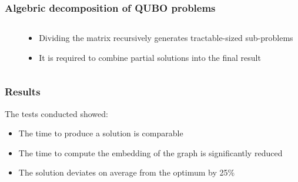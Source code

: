 \documentclass[aspectratio=169]{beamer}
\begin{document}
\begin{frame}\frametitle{Algebric decomposition of QUBO problems}

    \begin{columns}
        \begin{column}{0.5\textwidth}
            \begin{center}
            \end{center}
        \end{column}
        \begin{column}{0.5\textwidth}
            \begin{itemize}
                \item Dividing the matrix recursively generates tractable-sized sub-problems
                \item It is required to combine partial solutions into the final result
            \end{itemize}
        \end{column}
    \end{columns}

\end{frame}

\begin{frame}\frametitle{Results}

    The tests conducted showed:

    \begin{itemize}
        \item The time to produce a solution is comparable
        \item The time to compute the embedding of the graph is significantly reduced
        \item The solution deviates on average from the optimum by 25\%
    \end{itemize}

\end{frame}
\end{document}
